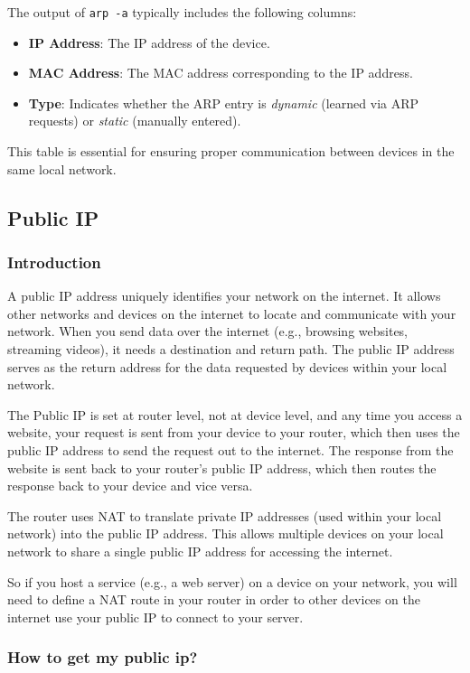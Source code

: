 \documentclass{article}
\begin{document}
The output of \texttt{arp -a} typically includes the following columns:
\begin{itemize}
    \item \textbf{IP Address}: The IP address of the device.
    \item \textbf{MAC Address}: The MAC address corresponding to the IP address.
    \item \textbf{Type}: Indicates whether the ARP entry is \textit{dynamic} (learned via ARP requests) or \textit{static} (manually entered).
\end{itemize}
This table is essential for ensuring proper communication between devices in the same local network.

\subsection{Public IP}

\subsubsection{Introduction}
A public IP address uniquely identifies your network on the internet. It allows other networks and devices on the internet to locate and communicate with your network. When you send data over the internet (e.g., browsing websites, streaming videos), it needs a destination and return path. The public IP address serves as the return address for the data requested by devices within your local network.

The Public IP is set at router level, not at device level, and any time you access a website, your request is sent from your device to your router, which then uses the public IP address to send the request out to the internet. The response from the website is sent back to your router's public IP address, which then routes the response back to your device and vice versa.

The router uses NAT to translate private IP addresses (used within your local network) into the public IP address. This allows multiple devices on your local network to share a single public IP address for accessing the internet.

So if you host a service (e.g., a web server) on a device on your network, you will need to define a NAT route in your router in order to other devices on the internet use your public IP to connect to your server.

\subsubsection{How to get my public ip?}
\end{document}
